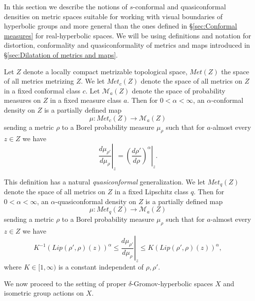 \documentclass[12pt]{amsbook}%
\theoremstyle{definition}
\theoremstyle{remark}
\newtheorem{rem}[thm]{Remark}
\numberwithin{section}{chapter}
\numberwithin{subsection}{section}
\numberwithin{figure}{chapter}
\def\cM{{\mathscr{M}}}
\def\ga{\gamma}
\def\al{\alpha}
\def\geo{\partial_\infty}
\def\kap{}
\begin{document}
{{%

In this section we describe the notions of  $s$-conformal and quasiconformal 
densities on metric spaces suitable for working with visual boundaries of hyperbolic groups and more general than the ones defined in \S \ref{sec:Conformal measures} for real-hyperbolic spaces. 
We will be using definitions and notation for distortion, conformality and quasiconformality of metrics and maps introduced in \S \ref{sec:Dilatation of metrics and maps}. 

Let $Z$ denote a locally compact metrizable topological space, 
$Met(Z)$ the space of all metrics metrizing $Z$. We let $Met_c(Z)$ denote the space of all metrics on $Z$ in a fixed conformal class $c$. Let $\cM_a(Z)$ denote the space of probability measures on $Z$ in a fixed measure class $a$. Then for $0<\al<\infty$, an $\al$-conformal density on $Z$ is a partially defined map
$$
\mu: Met_c(Z)\to \cM_a(Z)
$$
sending a metric $\rho$ to a Borel probability measure $\mu_\rho$ such that for $a$-almost every $z\in Z$ we have
$$
\left. \frac{d\mu_{\rho'}}{d\mu_{\rho}}\right\vert_z= \left. \left(\frac{d\rho'}{d\rho} \right)^\al \right\vert_z. 
$$

This definition has a natural {\em quasiconformal} generalization. We let $Met_q(Z)$ denote the space of all metrics on $Z$ in a fixed Lipschitz class $q$. 
Then for $0<\al<\infty$, an $\al$-quasiconformal density on $Z$ is a partially defined map
$$
\mu: Met_q(Z)\to \cM_a(Z)
$$
sending a metric $\rho$ to a Borel probability measure $\mu_\rho$ such that for $a$-almost every $z\in Z$ we have
$$
K^{-1}  \left(Lip(\rho',\rho)(z) \right)^\al \le \left. \frac{d\mu_{\rho'}}{d\mu_{\rho}}\right\vert_z\le K  \left(Lip(\rho',\rho)(z) \right)^\al, 
$$
where $K\in [1,\infty)$ is a constant independent of $\rho, \rho'$. 

\medskip 
We now proceed to the setting of proper $\delta$-Gromov-hyperbolic spaces $X$ and isometric group actions on $X$. 





}}
\end{document}
